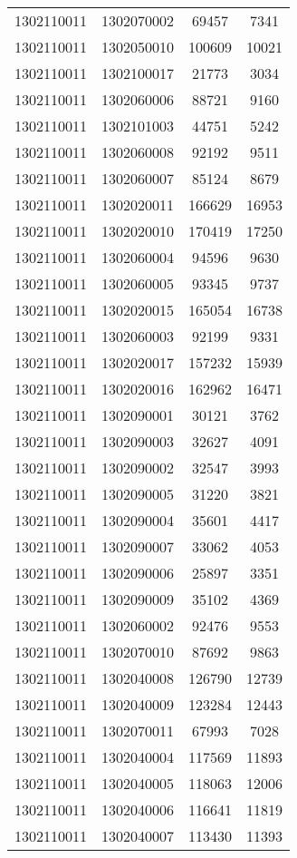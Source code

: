 \begin{longtable}[h]{llcc}
		1302110011 & 1302070002 & 69457 & 7341\\
		1302110011 & 1302050010 & 100609 & 10021\\
		1302110011 & 1302100017 & 21773 & 3034\\
		1302110011 & 1302060006 & 88721 & 9160\\
		1302110011 & 1302101003 & 44751 & 5242\\
		1302110011 & 1302060008 & 92192 & 9511\\
		1302110011 & 1302060007 & 85124 & 8679\\
		1302110011 & 1302020011 & 166629 & 16953\\
		1302110011 & 1302020010 & 170419 & 17250\\
		1302110011 & 1302060004 & 94596 & 9630\\
		1302110011 & 1302060005 & 93345 & 9737\\
		1302110011 & 1302020015 & 165054 & 16738\\
		1302110011 & 1302060003 & 92199 & 9331\\
		1302110011 & 1302020017 & 157232 & 15939\\
		1302110011 & 1302020016 & 162962 & 16471\\
		1302110011 & 1302090001 & 30121 & 3762\\
		1302110011 & 1302090003 & 32627 & 4091\\
		1302110011 & 1302090002 & 32547 & 3993\\
		1302110011 & 1302090005 & 31220 & 3821\\
		1302110011 & 1302090004 & 35601 & 4417\\
		1302110011 & 1302090007 & 33062 & 4053\\
		1302110011 & 1302090006 & 25897 & 3351\\
		1302110011 & 1302090009 & 35102 & 4369\\
		1302110011 & 1302060002 & 92476 & 9553\\
		1302110011 & 1302070010 & 87692 & 9863\\
		1302110011 & 1302040008 & 126790 & 12739\\
		1302110011 & 1302040009 & 123284 & 12443\\
		1302110011 & 1302070011 & 67993 & 7028\\
		1302110011 & 1302040004 & 117569 & 11893\\
		1302110011 & 1302040005 & 118063 & 12006\\
		1302110011 & 1302040006 & 116641 & 11819\\
		1302110011 & 1302040007 & 113430 & 11393\\

\end{longtable}
